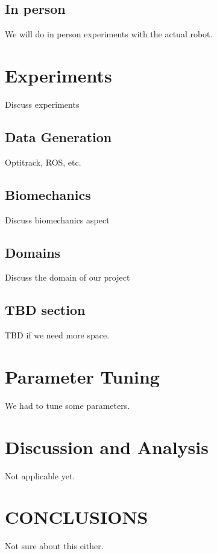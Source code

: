 \documentclass[letterpaper, 10 pt, conference]{ieeeconf}  %
\begin{document}
\subsection{In person}

We will do in person experiments with the actual robot.

\section{Experiments}
Discuss experiments

\subsection{Data Generation}
Optitrack, ROS, etc.

\subsection{Biomechanics}
Discuss biomechanics aspect

\subsection{Domains}
Discuss the domain of our project

\subsection{TBD section}
TBD if we need more space.

\section{Parameter Tuning}
We had to tune some parameters.

\section{Discussion and Analysis}
Not applicable yet.


\section{CONCLUSIONS}
Not sure about this either.

\addtolength{\textheight}{-12cm}   %
\end{document}
